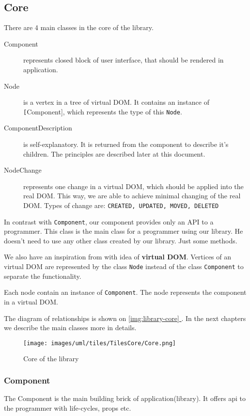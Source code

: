 \documentclass[oneside, 12pt]{book}
\newcommand*{\fullref}[1]{\hyperref[{#1}]{\autoref*{#1} \nameref*{#1}}}
\begin{document}
  \subsection{Core}\label{subsec:our-architecture-core}
    There are 4 main classes in the core of the library.
    \begin{description}
      \item[Component] 
        represents closed block of user interface, 
        that should be rendered in application.
      \item[Node]
        is a vertex in a tree of virtual DOM. 
        It contains an instance of \texttt[Component], which represents the type of this \texttt{Node}.
      \item[ComponentDescription]
        is self-explanatory. 
        It is returned from the component to describe it's children. 
				The principles are described later at this document.
      \item[NodeChange]
        represents one change in a virtual DOM, which should be applied into the real DOM. 
        This way, we are able to achieve minimal changing of the real DOM. 
        Types of change are: \texttt{CREATED, UPDATED, MOVED, DELETED}
    \end{description}

		In contrast with \facebook \react \texttt{Component}, our component provides only an API to a programmer.
    This class is the main class for a programmer using our library. 
		He doesn't need to use any other class created by our library. 
    Just some methods.

		We also have an inspiration from \react with idea of \textbf{virtual DOM}. 
		Vertices of an virtual DOM are represented by the class \texttt{Node} instead of the class \texttt{Component} to separate the functionality. 

    Each node contain an instance of \texttt{Component}. 
		The node represents the component in a virtual DOM.
    
    The diagram of relationships is shown on \fullref{img:library-core}. 
		In the next chapters we describe the main classes more in details.
    \begin{figure}[h]
    \centering  
      \texttt{[image: images/uml/tiles/TilesCore/Core.png]}
      \caption{Core of the library}
      \label{img:library-core}
    \end{figure}

    \subsubsection{Component}\label{subsubsec:our-architecture-core-component}
      The Component is the main building brick of application(library). 
      It offers api to the programmer with life-cycles, props etc. 
\end{document}
